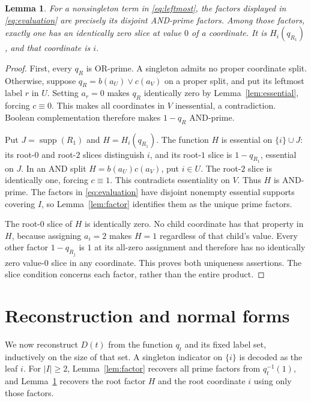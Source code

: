 \documentclass[11pt]{article}
\newtheorem{lemma}[theorem]{Lemma}
\DeclareMathOperator{\supp}{supp}
\begin{document}
\begin{lemma}\label{lem:recognition}
For a nonsingleton term in \eqref{eq:leftmost}, the factors displayed in
\eqref{eq:evaluation} are precisely its disjoint AND-prime factors.
Among those factors, exactly one has an identically zero slice at value
$0$ of a coordinate. It is $H_i(q_{R_1})$, and that coordinate is $i$.
\end{lemma}
\begin{proof}
First, every $q_R$ is OR-prime. A singleton admits no proper coordinate
split. Otherwise, suppose $q_R=b(a_U)\vee c(a_V)$ on a proper split, and
put its leftmost label $r$ in $U$. Setting $a_r=0$ makes $q_R$ identically
zero by Lemma~\ref{lem:essential}, forcing $c\equiv0$. This makes all
coordinates in $V$ inessential, a contradiction. Boolean complementation
therefore makes $1-q_R$ AND-prime.

Put $J=\supp(R_1)$ and $H=H_i(q_{R_1})$. The function $H$ is essential
on $\{i\}\cup J$: its root-$0$ and root-$2$ slices distinguish $i$,
and its root-$1$ slice is $1-q_{R_1}$, essential on $J$. In an AND split
$H=b(a_U)c(a_V)$, put $i\in U$. The root-$2$ slice is identically one,
forcing $c\equiv1$. This contradicts essentiality on $V$. Thus $H$ is
AND-prime. The factors in \eqref{eq:evaluation} have disjoint nonempty
essential supports covering $I$, so Lemma~\ref{lem:factor} identifies
them as the unique prime factors.

The root-$0$ slice of $H$ is identically zero. No child coordinate has
that property in $H$, because assigning $a_i=2$ makes $H=1$ regardless
of that child's value. Every other factor $1-q_{R_j}$ is $1$ at its
all-zero assignment and therefore has no identically zero value-$0$
slice in any coordinate. This proves both uniqueness assertions. The
slice condition concerns each factor, rather than the entire product.
\end{proof}

\section{Reconstruction and normal forms}

We now reconstruct $D(t)$ from the function $q_t$ and its fixed label
set, inductively on the size of that set. A singleton indicator on $\{i\}$
is decoded as the leaf $i$. For $|I|\geq2$, Lemma~\ref{lem:factor}
recovers all prime factors from $q_t^{-1}(1)$, and
Lemma~\ref{lem:recognition} recovers the root factor $H$ and the root
coordinate $i$ using only those factors.
\end{document}
